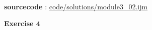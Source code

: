 \textbf{sourcecode} : \href{http://www.example.com/contents}{code/solutions/module3\_02.ijm}
\item \textbf{Exercise 4}